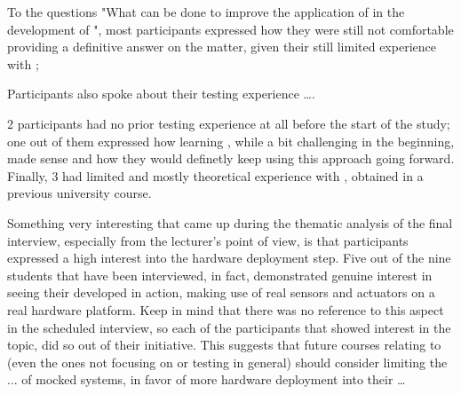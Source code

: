 To the questions "What can be done to improve the application of \tdd in the development of \ess", most participants expressed how they were still not comfortable providing a definitive answer on the matter, given their still limited experience with \tdd;

Participants also spoke about their testing experience \dots . 

2 participants had no prior testing experience at all before the start of the study; one out of them expressed how learning \tdd, while a bit challenging in the beginning, made sense and how they would definetly keep using this approach going forward.
Finally, 3 had limited and mostly theoretical experience with \tdd, obtained in a previous university course.


Something very interesting that came up during the thematic analysis of the final interview, especially from the lecturer's point of view, is that participants expressed a high interest into the hardware deployment step.
Five out of the nine students that have been interviewed, in fact, demonstrated genuine interest in seeing their developed \es in action, making use of real sensors and actuators on a real hardware platform. Keep in mind that there was no reference to this aspect in the scheduled interview, so each of the participants that showed interest in the topic, did so out of their initiative.
This suggests that future courses relating to \ess (even the ones not focusing on \tdd or \ess testing in general) should consider limiting the ... of mocked systems, in favor of more hardware deployment into their \dots
